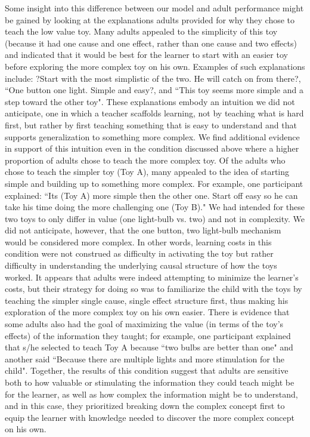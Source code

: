 \documentclass[10pt,letterpaper]{article}
\begin{document}
Some insight into this difference between our model and adult performance might be gained by looking at the explanations adults provided for why they chose to teach the low value toy. Many adults appealed to the simplicity of this toy (because it had one cause and one effect, rather than one cause and two effects) and indicated that it would be best for the learner to start with an easier toy before exploring the more complex toy on his own. Examples of such explanations include: ?Start with the most simplistic of the two. He will catch on from there?, ``One button one light. Simple and easy?, and ``This toy seems more simple and a step toward the other toy". These explanations embody an intuition we did not anticipate, one in which a teacher scaffolds learning, not by teaching what is hard first, but rather by first teaching something that is easy to understand and that supports generalization to something more complex. We find additional evidence in support of this intuition even in the condition discussed above where a higher proportion of adults chose to teach the more complex toy. Of the adults who chose to teach the simpler toy (Toy A), many appealed to the idea of starting simple and building up to something more complex. For example, one participant explained: ``Its (Toy A) more simple then the other one. Start off easy so he can take his time doing the more challenging one (Toy B)." We had intended for these two toys to only differ in value (one light-bulb vs. two) and not in complexity. We did not anticipate, however, that the one button, two light-bulb mechanism would be considered more complex. In other words, learning costs in this condition were not construed as difficulty in activating the toy but rather difficulty in understanding the underlying causal structure of how the toys worked. It appears that adults were indeed attempting to minimize the learner's costs, but their strategy for doing so was to familiarize the child with the toys by teaching the simpler single cause, single effect structure first, thus making his exploration of the more complex toy on his own easier. There is evidence that some adults also had the goal of maximizing the value (in terms of the toy's effects) of the information they taught; for example, one participant explained that s/he selected to teach Toy A because ``two bulbs are better than one" and another said ``Because there are multiple lights and more stimulation for the child". Together, the results of this condition suggest that adults are sensitive both to how valuable or stimulating the information they could teach might be for the learner, as well as how complex the information might be to understand, and in this case, they prioritized breaking down the complex concept first to equip the learner with knowledge needed to discover the more complex concept on his own.
\end{document}
